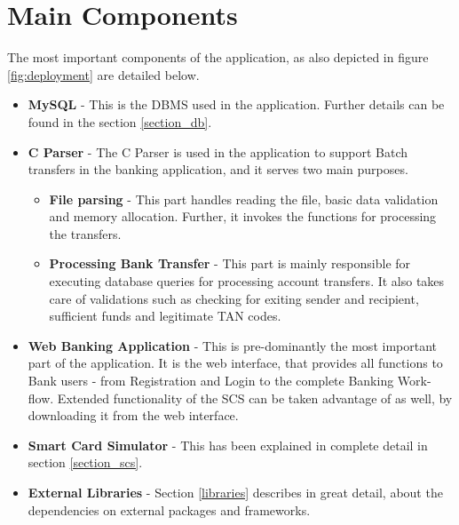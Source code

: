 \section{Main Components}

The most important components of the application, as also depicted in figure \ref{fig:deployment} are detailed below.

\begin{itemize}
\item \textbf{MySQL} - This is the DBMS used in the application. Further details can be found in the section \ref{section_db}.

\item \textbf{C Parser} - The C Parser is used in the application to support Batch transfers in the banking application, and it serves two main purposes. 

\begin{itemize}
\item \textbf{File parsing} - This part handles reading the file, basic data validation and memory allocation. Further, it invokes the functions for processing the transfers.
\item \textbf{Processing Bank Transfer} - This part is mainly responsible for executing database queries for processing account transfers. It also takes care of  validations such as checking for exiting sender and recipient, sufficient funds and legitimate TAN codes.
\end{itemize}

\item \textbf{Web Banking Application} - This is pre-dominantly the most important part of the application. It is the web interface, that provides all functions to Bank users - from Registration and Login to the complete Banking Work-flow. Extended functionality of the SCS can be taken advantage of as well, by downloading it from the web interface.

\item \textbf{Smart Card Simulator} - This has been explained in complete detail in section \ref{section_scs}.

\item \textbf{External Libraries} - Section \ref{libraries} describes in great detail, about the dependencies on external packages and frameworks.

\end{itemize}
\clearpage